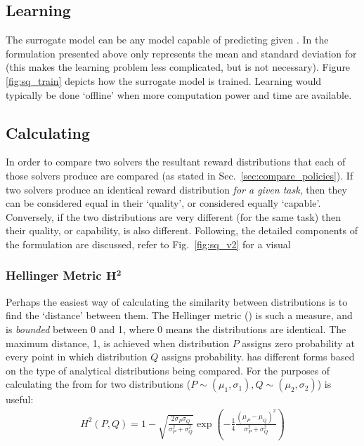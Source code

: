\subsection{Learning \surrogate}
The surrogate model \surrogate{} can be any model capable of predicting \rwdstarapprox{} given \task. In the formulation presented above \rwdstariapprox{} only represents the mean and standard deviation for \rwdstari{} (this makes the learning problem less complicated, but is not necessary). Figure \ref{fig:sq_train} depicts how the surrogate model is trained. Learning \surrogate{} would typically be done `offline' when more computation power and time are available.

\subsection{Calculating \xQ}
In order to compare two solvers the resultant reward distributions that each of those solvers produce are compared (as stated in Sec.~\ref{sec:compare_policies}). If two solvers produce an identical reward distribution \emph{for a given task}, then they can be considered equal in their `quality', or considered equally `capable'. Conversely, if the two distributions are very different (for the same task) then their quality, or capability, is also different. Following, the detailed components of the \xQ{} formulation are discussed, refer to Fig.~\ref{fig:sq_v2} for a visual 

\subsubsection{Hellinger Metric $\bm{H^2}$} \label{sec:hellinger}
Perhaps the easiest way of calculating the similarity between distributions is to find the `distance' between them. The Hellinger metric (\hell) is such a measure, and is \emph{bounded} between 0 and 1, where 0 means the distributions are identical. The maximum distance, 1, is achieved when distribution $P$ assigns zero probability at every point in which distribution $Q$ assigns probability.  \hell{} has different forms based on the type of analytical distributions being compared. For the purposes of calculating \xQ{} the from for two distributions ($P \sim (\mu_1,\sigma_1), Q\sim(\mu_2,\sigma_2)$) is useful:
\begin{align}
    H^{2}(P,Q) = 1-\sqrt{\frac{2\sigma_P\sigma_Q}{\sigma_P^2+\sigma_Q^2}}\exp{\left(-\frac{1}{4}\frac{(\mu_P-\mu_Q)^2}{\sigma_P^2+\sigma_Q^2}\right)}
\end{align}

